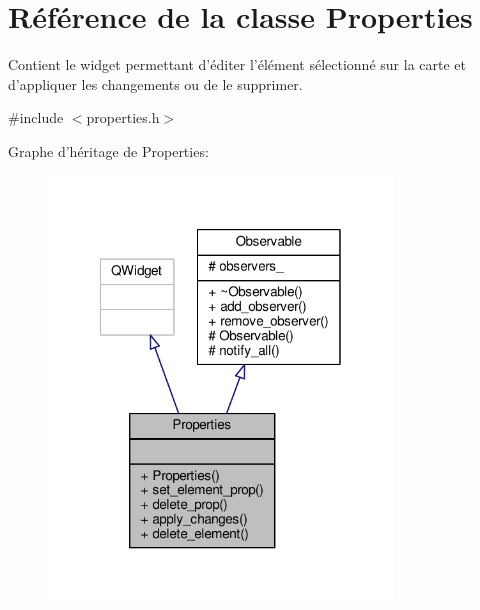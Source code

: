 \hypertarget{classProperties}{\section{Référence de la classe Properties}
\label{classProperties}
}


Contient le widget permettant d’éditer l’élément sélectionné sur la carte et d’appliquer les changements ou de le supprimer.  




{\ttfamily \#include $<$properties.\+h$>$}



Graphe d'héritage de Properties\+:
\nopagebreak
\begin{figure}[H]
\begin{center}
\leavevmode
\includegraphics[width=259pt]{de/d7f/classProperties__inherit__graph}
\end{center}
\end{figure}


